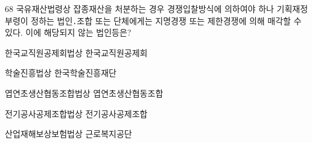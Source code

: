 \begin{question}{68}
국유재산법령상 잡종재산을 처분하는 경우 경쟁입찰방식에 의하여야 하나 기획재정부령이 정하는 법인․조합 또는 단체에게는 지명경쟁 또는 제한경쟁에 의해 매각할 수 있다. 이에 해당되지 않는 법인등은?
\begin{choices}
  \item 한국교직원공제회법상 한국교직원공제회
  \item 학술진흥법상 한국학술진흥재단
  \item 엽연초생산협동조합법상 엽연초생산협동조합
  \item 전기공사공제조합법상 전기공사공제조합
  \item 산업재해보상보험법상 근로복지공단
\end{choices}
\end{question}
